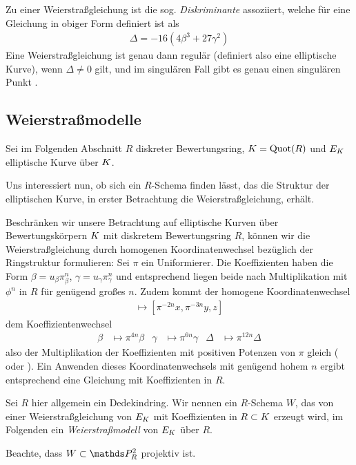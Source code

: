 \documentclass[german]{scrreprt}
\begin{document}
Zu einer Weierstraßgleichung ist die sog. \emph{Diskriminante}
assoziiert, welche für eine Gleichung in obiger Form definiert ist als
\begin{gather*}
  \Delta = -16\left(4\beta^3 + 27\gamma^2\right)
\end{gather*}
Eine Weierstraßgleichung ist genau dann regulär (definiert also eine
elliptische Kurve), wenn $\Delta\neq 0$ gilt,
und im singulären Fall gibt es genau einen singulären Punkt
\cite[Proposition III.1.4]{silverman}.


\subsection{Weierstraßmodelle}
Sei im Folgenden Abschnitt $R$ diskreter Bewertungsring,
$K=\operatorname{Quot}(R)$ und $E_{K}$ elliptische Kurve über $K$.

Uns interessiert nun, ob sich ein $R$-Schema finden lässt, das die
Struktur der elliptischen Kurve, in erster Betrachtung die
Weierstraßgleichung, erhält.

Beschränken wir unsere Betrachtung auf elliptische Kurven über
Bewertungskörpern $K$ mit diskretem Bewertungsring $R$, können wir
die Weierstraßgleichung durch homogenen Koordinatenwechsel bezüglich
der Ringstruktur formulieren:
Sei $\pi$ ein Uniformierer.
Die Koeffizienten haben die Form $\beta=u_\beta\pi^n_\beta$, $\gamma=u_\gamma\pi^n_\gamma$ und
entsprechend liegen beide nach Multiplikation mit $\phi^n$ in $R$ für
genügend großes $n$. Zudem kommt der homogene Koordinatenwechsel
\begin{gather*}
  [x,y,z] \longmapsto [\pi^{-2n}x, \pi^{-3n}y, z]
\end{gather*}
dem Koeffizientenwechsel
\begin{align*}
  \beta&\mapsto \pi^{4n}\beta
  &\gamma&\mapsto \pi^{6n}\gamma
  &\Delta&\mapsto \pi^{12n}\Delta
\end{align*}
also der Multiplikation der Koeffizienten mit positiven Potenzen von
$\pi$ gleich
(\cite[1.5, Lemma 2]{neron} oder \cite[Chapter VII.1]{silverman}).
Ein Anwenden dieses Koordinatenwechsels mit genügend hohem $n$ ergibt
entsprechend eine Gleichung mit Koeffizienten in $R$.

\begin{Definition}[Weierstraßmodell]
  Sei $R$ hier allgemein ein Dedekindring.
  Wir nennen ein $R$-Schema $W$, das von einer Weierstraßgleichung von
  $E_{K}$ mit Koeffizienten in $R\subset K$ erzeugt wird, im Folgenden
  ein \emph{Weierstraßmodell} von $E_{K}$ über $R$.

  Beachte, dass $W\subset\P_R^2$ projektiv ist.
\end{Definition}
\end{document}
